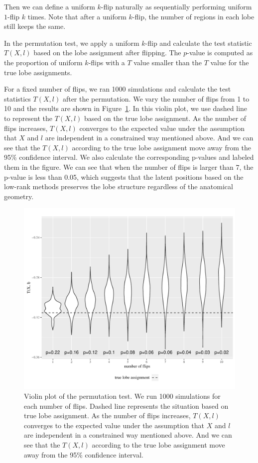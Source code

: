 Then we can define a uniform $k$-flip naturally as sequentially performing uniform $1$-flip $k$ times.
Note that after a uniform $k$-flip, the number of regions in each lobe still keeps the same.

In the permutation test, we apply a uniform $k$-flip and calculate the test statistic $T(X, l)$ based on the lobe assignment after flipping.
The $p$-value is computed as the proportion of uniform $k$-flips with a $T$ value smaller than the $T$ value for the true lobe assignments.


For a fixed number of flips, we ran 1000 simulations and calculate the test statistics $T(X, l)$ after the permutation. We vary the number of flips from 1 to 10 and the results are shown in Figure~\ref{fig:violin_plot}. In this violin plot, we use dashed line to represent the $T(X, l)$ based on the true lobe assignment. As the number of flips increases, $T(X, l)$ converges to the expected value under the assumption that $X$ and $l$ are independent in a constrained way mentioned above. And we can see that the $T(X, l)$ according to the true lobe assignment move away from the 95\% confidence interval. We also calculate the corresponding p-values and labeled them in the figure. We can see that when the number of flips is larger than 7, the p-value is less than 0.05, which suggests that the latent positions based on the low-rank methods preserves the lobe structure regardless of the anatomical geometry.

\begin{figure}[!htbp]
\centering
\includegraphics[width=1\textwidth]{./Figures/violinplot_new_flip_2norm_1_8.pdf}
\caption[Violin plot of the permutation test]{Violin plot of the permutation test.
We run 1000 simulations for each number of flips. Dashed line represents the situation based on true lobe assignment. As the number of flips increases, $T(X, l)$ converges to the expected value under the assumption that $X$ and $l$ are independent in a constrained way mentioned above. And we can see that the $T(X, l)$ according to the true lobe assignment move away from the 95\% confidence interval.}
\label{fig:violin_plot}
\end{figure}

